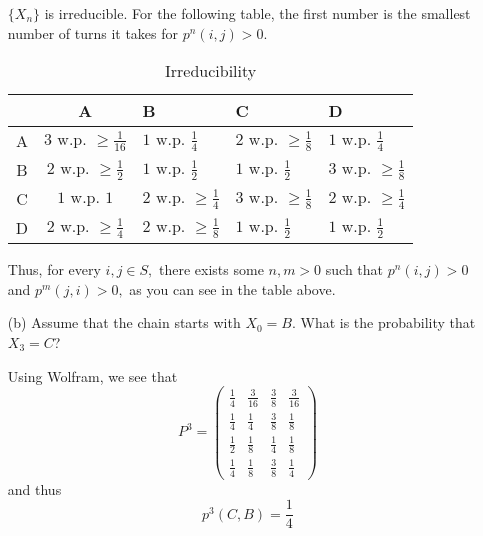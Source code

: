 \documentclass[11pt]{article}
\begin{document}
\begin{problem}
\begin{enumerate}
\begin{solution}
\begin{center}
\end{center}
$\{X_n\}$ is irreducible. For the following table, the first number is the smallest number of turns it takes for $p^n(i,j) >0.$ 
\begin{table}[H]
    \centering
    \begin{tabular}{|c|c|l|l|l|} \hline 
         &   A&B & C&D\\ \hline 
         A& 
     $3 \text{ w.p. } \geq\frac{1}{16}$ & $1 \text{ w.p. }\frac{1}{4}$& $2 \text{ w.p. }\geq\frac{1}{8}$ &$1 \text{ w.p. }\frac{1}{4}$\\ \hline 
 B&$2 \text{ w.p. }\geq\frac{1}{2}$ &$1 \text{ w.p. }\frac{1}{2}$ & $1 \text{ w.p. }\frac{1}{2}$&$3\text{ w.p. }\geq\frac{1}{8}$\\ \hline 
 C&$1 \text{ w.p. }{1}$ &$2 \text{ w.p. }\geq\frac{1}{4}$ &$3 \text{ w.p. }\geq\frac{1}{8}$ &$2 \text{ w.p. }\geq\frac{1}{4}$\\ \hline 
 D&$2 \text{ w.p. }\geq \frac{1}{4}$ &$2 \text{ w.p. }\geq\frac{1}{8}$ &$1 \text{ w.p. }\frac{1}{2}$ &$1 \text{ w.p. }\frac{1}{2}$\\ \hline\end{tabular}
    \caption{Irreducibility} 
\end{table}
Thus, for every $i,j \in S,$ there exists some $n,m>0$ such that $p^n(i,j) >0$ and $p^m(j,i) >0,$ as you can see in the table above. 
    \end{solution}
    \item[(b)] Assume that the chain starts with \( X_0 = B \). What is the probability that \( X_3 = C \)?
\begin{solution}
    Using Wolfram, we see that 
    \[P^3 = 
\begin{pmatrix}
\frac{1}{4} & \frac{3}{16} & \frac{3}{8} & \frac{3}{16} \\
\frac{1}{4} & \frac{1}{4} & \frac{3}{8} & \frac{1}{8} \\
\frac{1}{2} & \frac{1}{8} & \frac{1}{4} & \frac{1}{8} \\
\frac{1}{4} & \frac{1}{8} & \frac{3}{8} & \frac{1}{4}
\end{pmatrix}
\] and thus 
\[\boxed{p^3(C, B)} = \frac{1}{4}\]


\end{solution}
\end{enumerate}
\end{problem}
\end{document}

